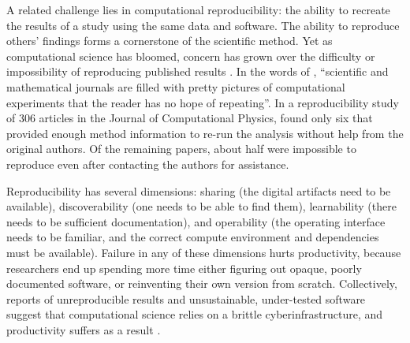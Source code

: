 \documentclass[journal abbreviation, manuscript]{copernicus}
\begin{document}
A related challenge lies in computational reproducibility: the ability to recreate the results of a study using the same data and software. The ability to reproduce others' findings forms a cornerstone of the scientific method. Yet as computational science has bloomed, concern has grown over the difficulty or impossibility of reproducing published results \citep[e.g.,][]{schwab2000making,peng2011reproducible,stodden2013setting,barba2016hard,alnoamany2018towards,chen2019open,krafczyk2019scientific}. In the words of \citet{leveque2009python}, ``scientific and mathematical journals are filled with pretty pictures of computational experiments that the reader has no hope of repeating''. In a reproducibility study of 306 articles in the Journal of Computational Physics, \citet{stodden2018enabling} found only six that provided enough method information to re-run the analysis without help from the original authors. Of the remaining papers, about half were impossible to reproduce even after contacting the authors for assistance.

Reproducibility has several dimensions: sharing (the digital artifacts need to be available), discoverability (one needs to be able to find them), learnability (there needs to be sufficient documentation), and operability (the operating interface needs to be familiar, and the correct compute environment and dependencies must be available). Failure in any of these dimensions hurts productivity, because researchers end up spending more time either figuring out opaque, poorly documented software, or reinventing their own version from scratch. Collectively, reports of unreproducible results and unsustainable, under-tested software suggest that computational science relies on a brittle cyberinfrastructure, and productivity suffers as a result \citep{wilson2006s,faulk2009scientific,prabhu2011survey}.
\end{document}
